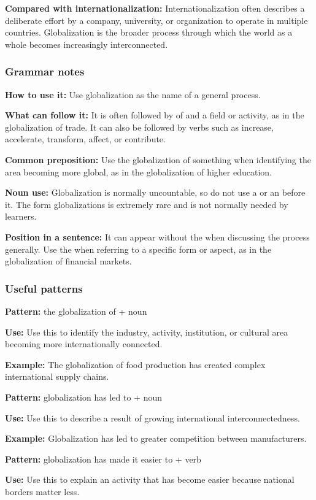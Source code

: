 \documentclass[11pt]{article}
\begin{document}
\textbf{Compared with internationalization:} Internationalization often describes a deliberate effort by a company, university, or organization to operate in multiple countries. Globalization is the broader process through which the world as a whole becomes increasingly interconnected.

\subsubsection{Grammar notes}
\textbf{How to use it:} Use globalization as the name of a general process.

\textbf{What can follow it:} It is often followed by of and a field or activity, as in the globalization of trade. It can also be followed by verbs such as increase, accelerate, transform, affect, or contribute.

\textbf{Common preposition:} Use the globalization of something when identifying the area becoming more global, as in the globalization of higher education.

\textbf{Noun use:} Globalization is normally uncountable, so do not use a or an before it. The form globalizations is extremely rare and is not normally needed by learners.

\textbf{Position in a sentence:} It can appear without the when discussing the process generally. Use the when referring to a specific form or aspect, as in the globalization of financial markets.

\subsubsection{Useful patterns}
\textbf{Pattern:} the globalization of + noun

\textbf{Use:} Use this to identify the industry, activity, institution, or cultural area becoming more internationally connected.

\textbf{Example:} The globalization of food production has created complex international supply chains.

\textbf{Pattern:} globalization has led to + noun

\textbf{Use:} Use this to describe a result of growing international interconnectedness.

\textbf{Example:} Globalization has led to greater competition between manufacturers.

\textbf{Pattern:} globalization has made it easier to + verb

\textbf{Use:} Use this to explain an activity that has become easier because national borders matter less.
\end{document}
